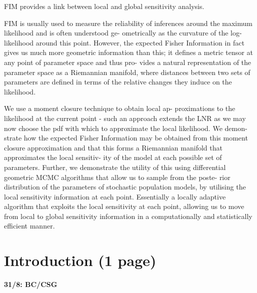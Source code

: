 \documentclass{pnastwo}
\begin{document}
\begin{article}
FIM provides a link between local and global sensitivity
analysis.

FIM is usually used to measure the reliability of inferences
around the maximum likelihood and is often understood ge-
ometrically as the curvature of the log-likelihood around this
point. However, the expected Fisher Information in fact gives
us much more geometric information than this; it defines a
metric tensor at any point of parameter space and thus pro-
vides a natural representation of the parameter space as a
Riemannian manifold, where distances between two sets of
parameters are defined in terms of the relative changes they
induce on the likelihood.

We use a moment closure technique to obtain local ap-
proximations to the likelihood at the current point - such an
approach extends the LNR as we may now choose the pdf
with which to approximate the local likelihood. We demon-
strate how the expected Fisher Information may be obtained
from this moment closure approximation and that this forms
a Riemannian manifold that approximates the local sensitiv-
ity of the model at each possible set of parameters. Further,
we demonstrate the utility of this using differential geometric
MCMC algorithms that allow us to sample from the poste-
rior distribution of the parameters of stochastic population
models, by utilising the local sensitivity information at each
point. Essentially a locally adaptive algorithm that exploits
the local sensitivity at each point, allowing us to move from
local to global sensitivity information in a computationally
and statistically efficient manner.

\section{Introduction (1 page)}
\label{s:intro}\textbf{31/8: BC/CSG}


\end{article}
\end{document}
